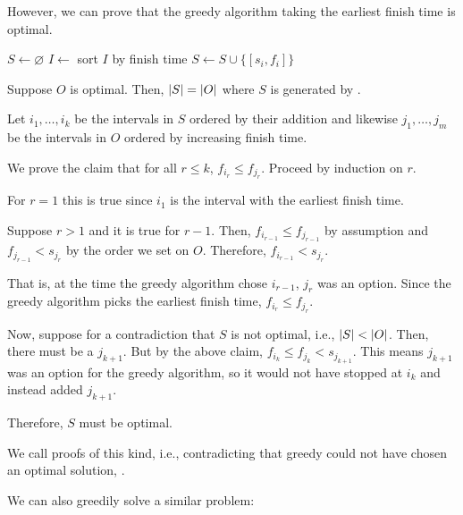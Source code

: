 However, we can prove that the greedy algorithm taking the earliest finish time is optimal.

\begin{algorithm}[H]
  \caption{\label{alg:g:is}}
  \begin{algorithmic}[1]
    \State $S \gets \varnothing$
    \State $I \gets$ sort $I$ by finish time
        \State $S \gets S \cup \{[s_i,f_i]\}$
      \EndIf
    \EndFor
  \end{algorithmic}
\end{algorithm}

\begin{prop}
  Suppose $O$ is optimal. Then, $\abs{S} = \abs{O}$ where $S$ is generated by .
\end{prop}
\begin{prf}
  Let $i_1,\dotsc,i_k$ be the intervals in $S$ ordered by their addition
  and likewise $j_1,\dotsc,j_m$ be the intervals in $O$ ordered by increasing finish time.

  We prove the claim that for all $r \leq k$, $f_{i_r} \leq f_{j_r}$.
  Proceed by induction on $r$.

  For $r=1$ this is true since $i_1$ is the interval with the earliest finish time.

  Suppose $r > 1$ and it is true for $r-1$.
  Then, $f_{i_{r-1}} \leq f_{j_{r-1}}$ by assumption and $f_{j_{r-1}} < s_{j_r}$
  by the order we set on $O$.
  Therefore, $f_{i_{r-1}} < s_{j_r}$.

  That is, at the time the greedy algorithm chose $i_{r-1}$, $j_r$ was an option.
  Since the greedy algorithm picks the earliest finish time, $f_{i_r} \leq f_{j_r}$.

  Now, suppose for a contradiction that $S$ is not optimal, i.e., $\abs{S} < \abs{O}$.
  Then, there must be a $j_{k+1}$.
  But by the above claim, $f_{i_k} \leq f_{j_k} < s_{j_{k+1}}$.
  This means $j_{k+1}$ was an option for the greedy algorithm,
  so it would not have stopped at $i_k$ and instead added $j_{k+1}$.

  Therefore, $S$ must be optimal.
\end{prf}

We call proofs of this kind, i.e., contradicting that greedy could not have
chosen an optimal solution, .

We can also greedily solve a similar problem:

